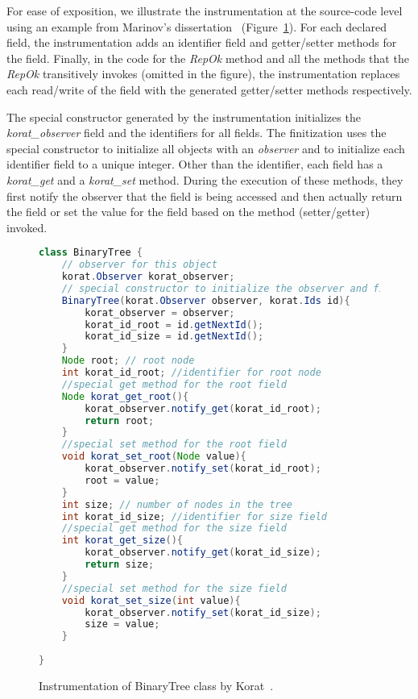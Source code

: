 \para For ease of exposition, we illustrate the instrumentation at the
source-code level using an example from Marinov's
dissertation~\cite{marinov2005automatic} (Figure~\ref{fig:btTreeInstrumentationKorat}).
For each declared field, the instrumentation adds an identifier field
and getter/setter methods for the field. Finally, in the code for the
\emph{RepOk} method and all the methods that the \emph{RepOk}
transitively invokes (omitted in the figure), the instrumentation
replaces each read/write of the field with the generated getter/setter
methods respectively.

\para The special constructor generated by the instrumentation
initializes the \emph{korat\_observer} field and the identifiers for all
fields. The finitization uses the special constructor to initialize
all objects with an \emph{observer} and to initialize each identifier field
to a unique integer. Other than the identifier, each field has a
\emph{korat\_get} and a \emph{korat\_set} method. During the execution of
these methods, they first notify the observer that the field is being
accessed and then actually return the field or set the value for the
field based on the method (setter/getter) invoked.


\begin{figure}
\centering
\begin{lstlisting}[language=Java]
class BinaryTree {
    // observer for this object
    korat.Observer korat_observer;
    // special constructor to initialize the observer and field ids
    BinaryTree(korat.Observer observer, korat.Ids id){
        korat_observer = observer;
        korat_id_root = id.getNextId();
        korat_id_size = id.getNextId();
    }
    Node root; // root node
    int korat_id_root; //identifier for root node
    //special get method for the root field
    Node korat_get_root(){
        korat_observer.notify_get(korat_id_root);
        return root;
    }
    //special set method for the root field
    void korat_set_root(Node value){
        korat_observer.notify_set(korat_id_root);
        root = value;
    }
    int size; // number of nodes in the tree
    int korat_id_size; //identifier for size field
    //special get method for the size field
    int korat_get_size(){ 
        korat_observer.notify_get(korat_id_size);
        return size;
    }
    //special set method for the size field
    void korat_set_size(int value){ 
        korat_observer.notify_set(korat_id_size);
        size = value;
    }
   
}
\end{lstlisting}
\caption{Instrumentation of BinaryTree class by Korat~\cite{marinov2005automatic}.}
\label{fig:btTreeInstrumentationKorat}
\end{figure}


